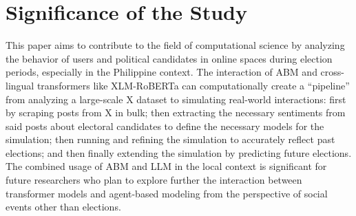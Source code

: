 \section{Significance of the Study}
This paper aims to contribute to the field of computational science by analyzing the behavior of users and political candidates in online spaces during election periods, especially in the Philippine context. The interaction of ABM and cross-lingual transformers like XLM-RoBERTa can computationally create a  “pipeline” from analyzing a large-scale X dataset to simulating real-world interactions: first by scraping posts from X in bulk; then extracting the necessary sentiments from said posts about electoral candidates to define the necessary models for the simulation; then running and refining the simulation to accurately reflect past elections; and then finally extending the simulation by predicting future elections. The combined usage of ABM and LLM in the local context is significant for future researchers who plan to explore further the interaction between transformer models and agent-based modeling from the perspective of social events other than elections.